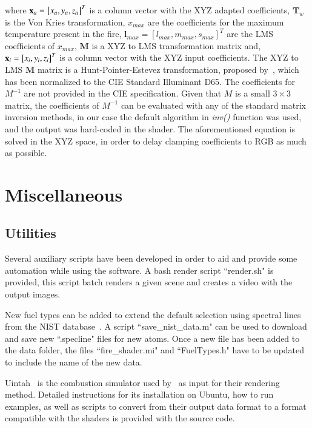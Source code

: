 where $\mathbf{x}_a = \left[ x_a, y_a, z_a \right]^{T}$ is a column vector with the XYZ adapted coefficients, $\mathbf{T}_w$ is the Von Kries transformation, $x_{max}$ are the coefficients for the maximum temperature present in the fire,  $\mathbf{l}_{max} = \left[ l_{max}, m_{max}, s_{max} \right]^{T}$ are the LMS coefficients of $x_{max}$, $\mathbf{M}$ is a XYZ to LMS transformation matrix and, $\mathbf{x}_i = \left[ x_i, y_i, z_i \right]^{T}$ is a column vector with the XYZ input coefficients.
The XYZ to LMS $\mathbf{M}$ matrix is a Hunt-Pointer-Estevez transformation, proposed by~\cite{Hunt:1985}, which has been normalized to the CIE Standard Illuminant D65.
The coefficients for $M^{-1}$ are not provided in the CIE specification.
Given that $M$ is a small $3 \times 3$ matrix, the coefficients of $M^{-1}$ can be evaluated with any of the standard matrix inversion methods, in our case the default algorithm in \Matlab \textit{inv()} function was used, and the output was hard-coded in the shader.
The aforementioned equation is solved in the XYZ space, in order to delay clamping coefficients to RGB as much as possible.

\section{Miscellaneous}
\label{sec:miscellaneous}

\subsection{Utilities}
\label{sec:utilities}

Several auxiliary scripts have been developed in order to aid and provide some automation while using the software.
A bash render script ``render.sh" is provided, this script batch renders a given \Maya scene and creates a video with the output images.

New fuel types can be added to extend the default selection using spectral lines from the NIST database~\cite{Nist}.
A \Matlab script ``save\_nist\_data.m" can be used to download and save new ``.specline" files for new atoms.
Once a new file has been added to the data folder, the files ``fire\_shader.mi" and ``FuelTypes.h" have to be updated to include the name of the new data.

Uintah~\cite{Uintah} is the combustion simulator used by~\cite{Pegoraro:2006} as input for their rendering method.
Detailed instructions for its installation on Ubuntu, how to run examples, as well as scripts to convert from their output data format to a format compatible with the shaders is provided with the source code.

